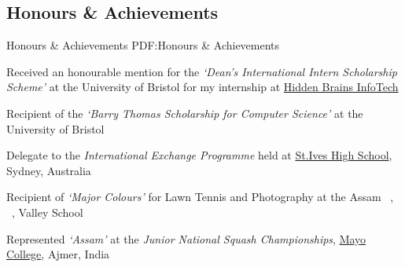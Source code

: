 \documentclass[a4paper,10pt,oneside]{article}
\begin{document}
\begin{body}
\section
{Honours \newline \& \newline Achievements}
{Honours \& Achievements}
{PDF:Honours \& Achievements}
\begin{itemslist}
\item
Received an honourable mention for the \textit{`Dean's International Intern Scholarship Scheme'} \hfill {} \newline
at the University of Bristol for my internship at
\href{http://www.hiddenbrains.com/}
{Hidden Brains InfoTech}
\item
Recipient of the \textit{`Barry Thomas Scholarship for Computer Science'} at the University \hfill {} \newline
of Bristol
\item
Delegate to the \textit{International Exchange Programme} held at \href{http://www.stives-h.schools.nsw.edu.au/}{St.Ives High School}, \hfill {} \newline
Sydney, Australia
\item
Recipient of \textit{`Major Colours'} for Lawn Tennis and Photography at the Assam \hfill {}\ , {}\ , {} \newline Valley School
\item
Represented \textit{`Assam'} at the \textit{Junior National Squash Championships}, \href{https://www.mayocollege.com/}{Mayo College}, Ajmer, India \hfill {}
\end{itemslist}
\vspace{-5pt}
\hline





\end{body}
\end{document}
